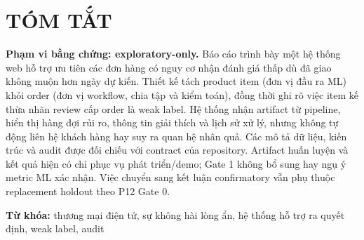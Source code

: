 
\section*{TÓM TẮT}

\textbf{Phạm vi bằng chứng: exploratory-only.} Báo cáo trình bày một hệ thống web hỗ trợ ưu tiên các đơn hàng có nguy cơ nhận đánh giá thấp dù đã giao không muộn hơn ngày dự kiến. Thiết kế tách product item (đơn vị đầu ra ML) khỏi order (đơn vị workflow, chia tập và kiểm toán), đồng thời ghi rõ việc item kế thừa nhãn review cấp order là weak label. Hệ thống nhận artifact từ pipeline, hiển thị hàng đợi rủi ro, thông tin giải thích và lịch sử xử lý, nhưng không tự động liên hệ khách hàng hay suy ra quan hệ nhân quả. Các mô tả dữ liệu, kiến trúc và audit được đối chiếu với contract của repository. Artifact huấn luyện và kết quả hiện có chỉ phục vụ phát triển/demo; Gate 1 không bổ sung hay ngụ ý metric ML xác nhận. Việc chuyển sang kết luận confirmatory vẫn phụ thuộc replacement holdout theo P12 Gate 0.

\noindent\textbf{Từ khóa:} thương mại điện tử, sự không hài lòng ẩn, hệ thống hỗ trợ ra quyết định, weak label, audit
